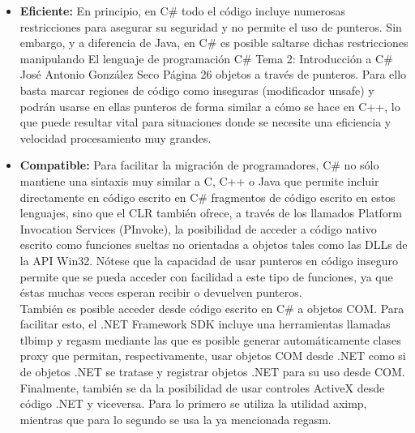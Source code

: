 \begin{itemize}
\begin{itemize}
		\item Si no se considera redefinici\'on, entonces se considera que lo que se desea es ocultar el m\'etodo de la clase padre, de modo que para la clase hija sea como si nunca hubiese existido. El compilador avisar\'a de esta decisi\'on a trav\'es de un mensaje de aviso que puede suprimirse incluyendo el modificador new en la definici\'on del miembro en la clase hija para as\'i indicarle expl\'icitamente la intenci\'on de ocultaci\'on. 
	\end{itemize}

	\item \textbf{Eficiente: } En principio, en C\# todo el c\'odigo incluye numerosas restricciones para asegurar su seguridad y no permite el uso de punteros. Sin embargo, y a diferencia de Java, en C\# es posible saltarse dichas restricciones manipulando El lenguaje de programaci\'on C\# Tema 2: Introducci\'on a C\# Jos\'e Antonio Gonz\'alez Seco P\'agina 26 objetos a trav\'es de punteros. Para ello basta marcar regiones de c\'odigo como inseguras (modificador unsafe) y podr\'an usarse en ellas punteros de forma similar a c\'omo se hace en C++, lo que puede resultar vital para situaciones donde se necesite una eficiencia y velocidad procesamiento muy grandes. 

	\item \textbf{Compatible: } Para facilitar la migraci\'on de programadores, C\# no s\'olo mantiene una sintaxis muy similar a C, C++ o Java que permite incluir directamente en c\'odigo escrito en C\# fragmentos de c\'odigo escrito en estos lenguajes, sino que el CLR tambi\'en ofrece, a trav\'es de los llamados Platform Invocation Services (PInvoke), la posibilidad de acceder a c\'odigo nativo escrito como funciones sueltas no orientadas a objetos tales como las DLLs de la API Win32. N\'otese que la capacidad de usar punteros en c\'odigo inseguro permite que se pueda acceder con facilidad a este tipo de funciones, ya que \'estas muchas veces esperan recibir o devuelven punteros.\\

	Tambi\'en es posible acceder desde c\'odigo escrito en C\# a objetos COM. Para facilitar esto, el .NET Framework SDK incluye una herramientas llamadas tlbimp y regasm mediante las que es posible generar autom\'aticamente clases proxy que permitan, respectivamente, usar objetos COM desde .NET como si de objetos .NET se tratase y registrar objetos .NET para su uso desde COM.\\

	Finalmente, tambi\'en se da la posibilidad de usar controles ActiveX desde c\'odigo .NET y viceversa. Para lo primero se utiliza la utilidad aximp, mientras que para lo segundo se usa la ya mencionada regasm.
\end{itemize}






